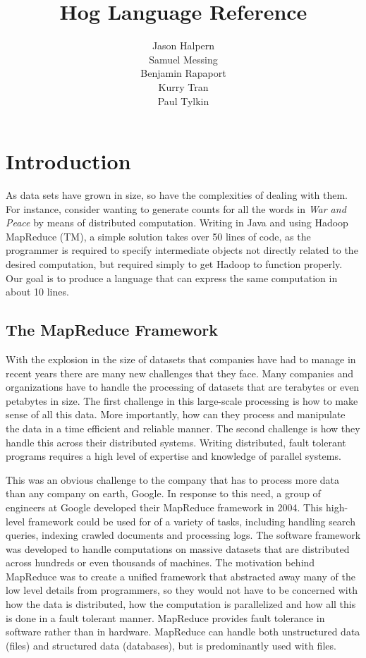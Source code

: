 \documentclass{book}
\title{\huge \textbf{Hog Language Reference}}
\author{Jason Halpern\\ Samuel Messing\\ 
        Benjamin Rapaport \\  Kurry Tran \\ Paul Tylkin}
\begin{document}
\maketitle
\tableofcontents

\chapter{Introduction}
\label{cha:introduction}

As data sets have grown in size, so have the complexities of dealing with them.
For instance, consider wanting to generate counts for all the words in \emph{War
and Peace} by means of distributed computation. Writing in Java and using Hadoop
MapReduce (TM), a simple solution takes over 50 lines of code, as the programmer
is required to specify intermediate objects not directly related to the desired
computation, but required simply to get Hadoop to function properly. Our goal is
to produce a language that can express the same computation in about 10 lines.

\section{The MapReduce Framework}
\label{sec:mapreduce}

With the explosion in the size of datasets that companies have had to manage in
recent years there are many new challenges that they face. Many companies and
organizations have to handle the processing of datasets that are terabytes or even
petabytes in size. The first challenge in this large-scale processing is how to
make sense of all this data. More importantly, how can they process and manipulate
the data in a time efficient and reliable manner. The second challenge is how they
handle this across their distributed systems. Writing distributed, fault tolerant
programs requires a high level of expertise and knowledge of parallel systems.

This was an obvious challenge to the company that has to process more data than any
company on earth, Google. In response to this need, a group of engineers at Google
developed their MapReduce framework in 2004. This high-level framework could be
used for of a variety of tasks, including handling search queries, indexing crawled
documents and processing logs. The software framework was developed to handle
computations on massive datasets that are distributed across hundreds or even
thousands of machines. The motivation behind MapReduce was to create a unified
framework that abstracted away many of the low level details from programmers, so
they would not have to be concerned with how the data is distributed, how the
computation is parallelized and how all this is done in a fault tolerant manner.
MapReduce provides fault tolerance in software rather than in hardware. MapReduce
can handle both unstructured data (files) and structured data (databases), but is
predominantly used with files.
\end{document}
